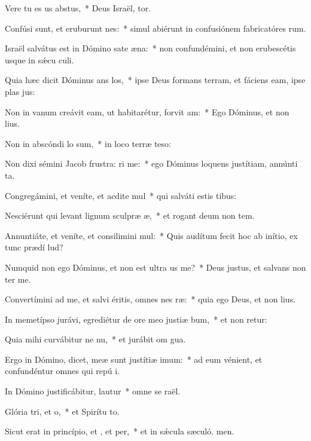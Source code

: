 \item Vere tu es us abstus,~* Deus Israël, tor.
\item Confúsi sunt, et eruburunt nes:~* simul abiérunt in confusiónem fabricatóres rum.
\item Israël salvátus est in Dómino sate æna:~* non confundémini, et non erubescétis usque in sǽcu culi.
\item Quia hæc dicit Dóminus ans los,~* ipse Deus formans terram, et fáciens eam, ipse plas jus:
\item Non in vanum creávit eam, ut habitarétur, forvit am:~* Ego Dóminus, et non  lius.
\item Non in abscóndi lo sum,~* in loco terræ teso:
\item Non dixi sémini Jacob frustra: ri me:~* ego Dóminus loquens justítiam, annúnti ta.
\item Congregámini, et veníte, et acdite mul~* qui salváti estis  tibus:
\item Nesciérunt qui levant lignum sculpræ æ,~* et rogant deum non tem.
\item Annuntiáte, et veníte, et consilimini mul:~* Quis audítum fecit hoc ab inítio, ex tunc prædí lud?
\item Numquid non ego Dóminus, et non est ultra us  me?~* Deus justus, et salvans non  ter me.
\item Convertímini ad me, et salvi éritis, omnes nes ræ:~* quia ego Deus, et non  lius.
\item In memetípso jurávi, egrediétur de ore meo justiæ bum,~* et non retur:
\item Quia mihi curvábitur ne nu,~* et jurábit om gua.
\item Ergo in Dómino, dicet, meæ sunt justítiæ  imum:~* ad eum vénient, et confundéntur omnes qui repú i.
\item In Dómino justificábitur,  lautur~* omne se raël.
\item Glória tri, et o,~* et Spirítu to.
\item Sicut erat in princípio, et , et per,~* et in sǽcula sæculó. men.
